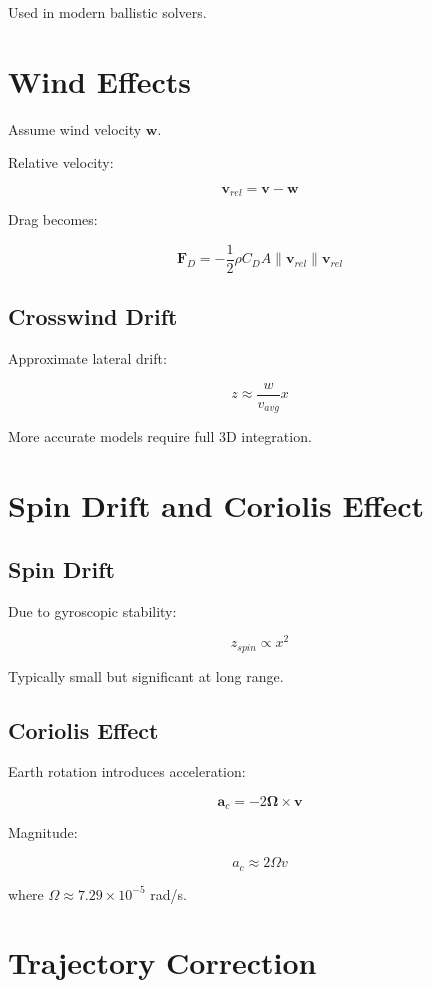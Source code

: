 \documentclass[11pt]{article}
\begin{document}
	Used in modern ballistic solvers.
	
	\section{Wind Effects}
	
	Assume wind velocity $\bm{w}$.
	
	Relative velocity:
	
	\[
	\bm{v}_{rel} = \bm{v} - \bm{w}
	\]
	
	Drag becomes:
	
	\[
	\bm{F}_D = -\frac{1}{2} \rho C_D A \|\bm{v}_{rel}\| \bm{v}_{rel}
	\]
	
	\subsection{Crosswind Drift}
	
	Approximate lateral drift:
	
	\[
	z \approx \frac{w}{v_{avg}} x
	\]
	
	More accurate models require full 3D integration.
	
	\section{Spin Drift and Coriolis Effect}
	
	\subsection{Spin Drift}
	
	Due to gyroscopic stability:
	
	\[
	z_{spin} \propto x^2
	\]
	
	Typically small but significant at long range.
	
	\subsection{Coriolis Effect}
	
	Earth rotation introduces acceleration:
	
	\[
	\bm{a}_c = -2 \bm{\Omega} \times \bm{v}
	\]
	
	Magnitude:
	
	\[
	a_c \approx 2 \Omega v
	\]
	
	where $\Omega \approx 7.29 \times 10^{-5}$ rad/s.
	
	\section{Trajectory Correction}
	
\end{document}
